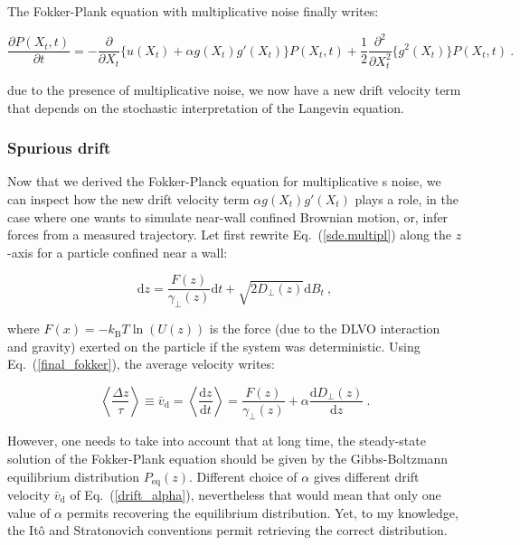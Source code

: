 The Fokker-Plank equation with multiplicative noise finally writes:

\begin{equation}
	\frac{\partial P(X_t, t)}{\partial t} = -\frac{\partial}{\partial X_t} \{u(X_t) + \alpha g(X_t)g'(X_t)\} P(X_t, t) + \frac{1}{2}\frac{\partial^2}{\partial X_t^2} \{g^2(X_t) \} P(X_t, t)~.
	\label{final_fokker}
\end{equation} 

due to the presence of multiplicative noise, we now have a new drift velocity term that depends on the stochastic interpretation of the Langevin equation.

\subsubsection{Spurious drift}
\label{sec:spurious}

Now that we derived the Fokker-Planck equation for multiplicative s noise, we can inspect how the new drift velocity term $\alpha g(X_t)g'(X_t)$ plays a role, in the case where one wants to simulate near-wall confined Brownian motion, or, infer forces from a measured trajectory. Let first rewrite Eq.~(\ref{sde.multipl}) along the $z$-axis for a particle confined near a wall:

\begin{equation}
	\mathrm{d}z = \frac{F(z)}{\gamma_\bot (z)} \mathrm{d}t + \sqrt{2 D_\bot(z)}\mathrm{d}B_t ~,
\end{equation}

where $F(x)=-k_\mathrm{B}T \ln (U(z))$ is the force (due to the DLVO interaction and gravity) exerted on the particle if the system was deterministic. Using Eq.~(\ref{final_fokker}), the average velocity writes:

\begin{equation}
	\left\langle \frac{\Delta z}{ \tau} \right\rangle  \equiv \bar{v}_\mathrm{d}
	=\left\langle \frac{\mathrm{d}z}{\mathrm{d}t} \right\rangle = \frac{F(z)}{\gamma_\bot (z)} + \alpha \frac{\mathrm{d} D_\bot(z)}{\mathrm{d}z} ~. 
	\label{drift_alpha}
\end{equation}

However, one needs to take into account that at long time, the steady-state solution of the Fokker-Plank equation should be given by the Gibbs-Boltzmann equilibrium distribution $P_\mathrm{eq}(z)$. Different choice of $\alpha$ gives different drift velocity $\bar{v}_\mathrm{d}$ of Eq.~(\ref{drift_alpha}), nevertheless that would mean that only one value of $\alpha$ permits recovering the equilibrium distribution. Yet, to my knowledge, the Itô and Stratonovich conventions permit retrieving the correct distribution. 

